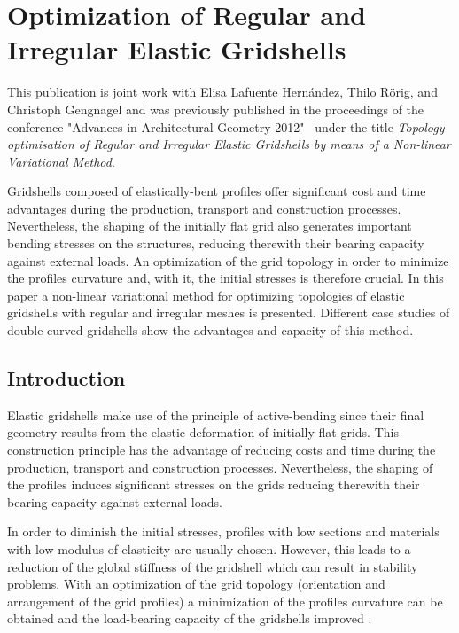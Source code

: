 \documentclass[Thesis.tex]{subfiles}
\begin{document}
\chapter{Optimization of Regular and Irregular Elastic Gridshells}
\label{chp:gridshells}

This publication is joint work with Elisa Lafuente Hern\'andez, Thilo R\"orig, and Christoph Gengnagel and was
previously published in the proceedings of the conference "Advances in Architectural Geometry 2012"~\cite{Lafuente2012} under the title \emph{Topology optimisation of Regular and Irregular Elastic Gridshells by means of a Non-linear Variational Method}.

Gridshells composed of elastically-bent profiles offer significant cost and time advantages during the production, transport and construction processes. Nevertheless, the shaping of the initially flat grid also generates important bending stresses on the structures, reducing therewith their bearing capacity against external loads. An optimization of the grid topology in order to minimize the profiles curvature and, with it, the initial stresses is therefore crucial. In this paper a non-linear variational method for optimizing topologies of elastic gridshells with regular and irregular meshes is presented. Different case studies of double-curved gridshells show the advantages and capacity of this method.

\section{Introduction}

Elastic gridshells make use of the principle of active-bending \cite{AlpermannLG2012} since their final geometry results from the elastic deformation of initially flat grids. This construction principle has the advantage of reducing costs and time during the production, transport and construction processes. Nevertheless, the shaping of the profiles induces significant stresses on the grids reducing therewith their bearing capacity against external loads.  

In order to diminish the initial stresses, profiles with low sections and materials with low modulus of elasticity are usually chosen. However, this leads to a reduction of the global stiffness of the gridshell which can result in stability problems. With an optimization of the grid topology (orientation and arrangement of the grid profiles) a minimization of the profiles curvature can be obtained and the load-bearing capacity of the gridshells improved \cite{Lafuente2011}.  
\end{document}
